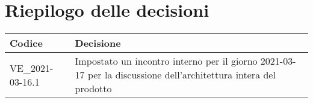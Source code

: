 \section{Riepilogo delle decisioni}
\setcounter{table}{-1}
{
\centering
\renewcommand{\arraystretch}{1.5}
\begin{longtable}{>{\centering}p{} >{}p{}}
\rowcolor{azzurro1}
\textbf{Codice} &
\centerline{\textbf{Decisione}}\\
\endhead

VE{\_}2021-03-16.1 & Impostato un incontro interno per il giorno 2021-03-17 per la discussione dell'architettura intera del prodotto\\
\end{longtable}
}